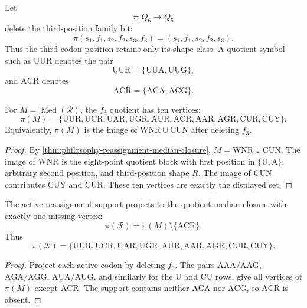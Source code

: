 \begin{definition}[$f_{3}$ quotient]
\label{def:philosophy-f3-quotient}
Let
$$
  \pi:Q_{6}\to Q_{5}
$$
delete the third-position family bit:
$$
  \pi(s_{1},f_{1},s_{2},f_{2},s_{3},f_{3})
  =
  (s_{1},f_{1},s_{2},f_{2},s_{3}).
$$
Thus the third codon position retains only its shape class. A quotient
symbol such as $\mathrm{UUR}$ denotes the pair
$$
  \mathrm{UUR}=\{\mathrm{UUA},\mathrm{UUG}\},
$$
and $\mathrm{ACR}$ denotes
$$
  \mathrm{ACR}=\{\mathrm{ACA},\mathrm{ACG}\}.
$$
\end{definition}

\begin{theorem}
\label{thm:philosophy-median-closure-quotient}
For $M=\operatorname{Med}(\mathcal{R})$, the $f_{3}$ quotient has ten
vertices:
$$
  \pi(M)
  =
  \{\mathrm{UUR},\mathrm{UCR},\mathrm{UAR},\mathrm{UGR},
    \mathrm{AUR},\mathrm{ACR},\mathrm{AAR},\mathrm{AGR},
    \mathrm{CUR},\mathrm{CUY}\}.
$$
Equivalently, $\pi(M)$ is the image of
$\mathrm{WNR}\cup\mathrm{CUN}$ after deleting $f_{3}$.
\end{theorem}
\begin{proof}
By \autoref{thm:philosophy-reassignment-median-closure},
$M=\mathrm{WNR}\cup\mathrm{CUN}$. The image of $\mathrm{WNR}$ is the
eight-point quotient block with first position in $\{\mathrm{U},\mathrm{A}\}$,
arbitrary second position, and third-position shape $R$. The image of
$\mathrm{CUN}$ contributes $\mathrm{CUY}$ and $\mathrm{CUR}$. These ten
vertices are exactly the displayed set.
\end{proof}

\begin{theorem}
\label{thm:philosophy-active-quotient-one-hole}
The active reassignment support projects to the quotient median closure
with exactly one missing vertex:
$$
  \pi(\mathcal{R})
  =
  \pi(M)\setminus\{\mathrm{ACR}\}.
$$
Thus
$$
  \pi(\mathcal{R})
  =
  \{\mathrm{UUR},\mathrm{UCR},\mathrm{UAR},\mathrm{UGR},
    \mathrm{AUR},\mathrm{AAR},\mathrm{AGR},\mathrm{CUR},
    \mathrm{CUY}\}.
$$
\end{theorem}
\begin{proof}
Project each active codon by deleting $f_{3}$. The pairs
$\mathrm{AAA}/\mathrm{AAG}$, $\mathrm{AGA}/\mathrm{AGG}$,
$\mathrm{AUA}/\mathrm{AUG}$, and similarly for the $\mathrm{U}$ and
$\mathrm{CU}$ rows, give all vertices of $\pi(M)$ except
$\mathrm{ACR}$. The support contains neither $\mathrm{ACA}$ nor
$\mathrm{ACG}$, so $\mathrm{ACR}$ is absent.
\end{proof}

